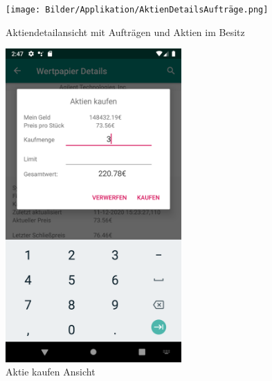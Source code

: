 \documentclass[10pt]{scrartcl}
\begin{document}
\begin{figure}[H]
	\centering
	\texttt{[image: Bilder/Applikation/AktienDetailsAufträge.png]}
	\caption{Aktiendetailansicht mit Aufträgen und Aktien im Besitz}
\end{figure}

\begin{figure}[H]
	\centering
	\includegraphics[width=0.6\textwidth]{Bilder/Applikation/AktieKaufen.png}
	\caption{Aktie kaufen Ansicht}
\end{figure}
\end{document}
